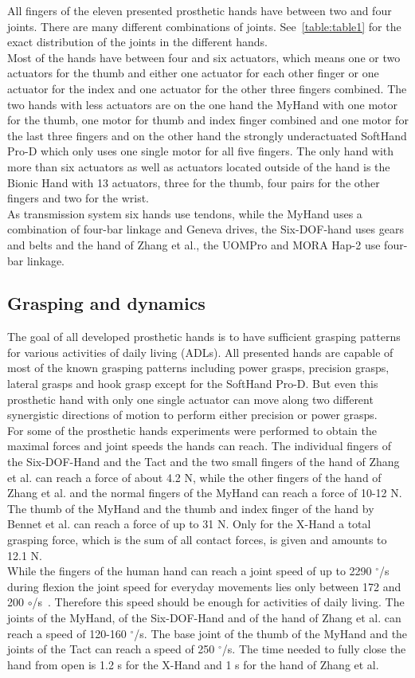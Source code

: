 \documentclass[a4paper, 10pt, conference]{ieeeconf}      %
\begin{document}
All fingers of the eleven presented prosthetic hands have between two and four joints. There are many different combinations of joints. See~\ref{table:table1} for the exact distribution of the joints in the different hands.\\
Most of the hands have between four and six actuators, which means one or two actuators for the thumb and either one actuator for each other finger or one actuator for the index and one actuator for the other three fingers combined. The two hands with less actuators are on the one hand the MyHand with one motor for the thumb, one motor for thumb and index finger combined and one motor for the last three fingers and on the other hand the strongly underactuated SoftHand Pro-D which only uses one single motor for all five fingers. The only hand with more than six actuators as well as actuators located outside of the hand is the Bionic Hand with 13 actuators, three for the thumb, four pairs for the other fingers and two for the wrist.\\
As transmission system six hands use tendons, while the MyHand uses a combination of four-bar linkage and Geneva drives, the Six-DOF-hand uses gears and belts and the hand of Zhang et al., the UOMPro and MORA Hap-2 use four-bar linkage.

\subsection{Grasping and dynamics}

The goal of all developed prosthetic hands is to have sufficient grasping patterns for various activities of daily living (ADLs). All presented hands are capable of most of the known grasping patterns including power grasps, precision grasps, lateral grasps and hook grasp except for the SoftHand Pro-D. But even this prosthetic hand with only one single actuator can move along two different synergistic directions of motion to perform either precision or power grasps.\\
For some of the prosthetic hands experiments were performed to obtain the maximal forces and joint speeds the hands can reach. The individual fingers of the Six-DOF-Hand and the Tact and the two small fingers of the hand of Zhang et al. can reach a force of about 4.2 N, while the other fingers of the hand of Zhang et al. and the normal fingers of the MyHand can reach a force of 10-12 N. The thumb of the MyHand and the thumb and index finger of the hand by Bennet et al. can reach a force of up to 31 N. Only for the X-Hand a total grasping force, which is the sum of all contact forces, is given and amounts to 12.1 N.\\
While the fingers of the human hand can reach a joint speed of up to 2290 $^\circ$/s during flexion the joint speed for everyday movements lies only between 172 and 200 $\circ$/s~\cite{weir}. Therefore this speed should be enough for activities of daily living. The joints of the MyHand, of the Six-DOF-Hand and of the hand of Zhang et al. can reach a speed of 120-160 $^\circ$/s. The base joint of the thumb of the MyHand and the joints of the Tact can reach a speed of 250 $^\circ$/s. The time needed to fully close the hand from open is 1.2 s for the X-Hand and 1 s for the hand of Zhang et al.
\end{document}
